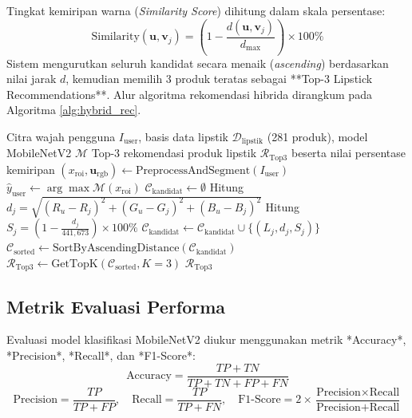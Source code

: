 \documentclass[10pt,a4paper]{article}
\begin{document}
Tingkat kemiripan warna (\textit{Similarity Score}) dihitung dalam skala persentase:
\begin{equation}
 \text{Similarity}(\mathbf{u}, \mathbf{v}_j) = \left( 1 - \frac{d(\mathbf{u}, \mathbf{v}_j)}{d_{\max}} \right) \times 100\%
 \label{eq:similarity}
\end{equation}
Sistem mengurutkan seluruh kandidat secara menaik (\textit{ascending}) berdasarkan nilai jarak $d$, kemudian memilih 3 produk teratas sebagai **Top-3 Lipstick Recommendations**. Alur algoritma rekomendasi hibrida dirangkum pada Algoritma \ref{alg:hybrid_rec}.

\begin{algorithm}[H]
\caption{Algoritma Hybrid Recommendation System untuk Rekomendasi Lipstik}
\label{alg:hybrid_rec}
\fontsize{8.5pt}{11pt}\selectfont
\begin{algorithmic}[1]
\Require Citra wajah pengguna $I_{\text{user}}$, basis data lipstik $\mathcal{D}_{\text{lipstik}}$ (281 produk), model MobileNetV2 $\mathcal{M}$
\Ensure Top-3 rekomendasi produk lipstik $\mathcal{R}_{\text{Top3}}$ beserta nilai persentase kemiripan
\State $(x_{\text{roi}}, \mathbf{u}_{\text{rgb}}) \leftarrow \text{PreprocessAndSegment}(I_{\text{user}})$ 
\State $\hat{y}_{\text{user}} \leftarrow \arg\max \mathcal{M}(x_{\text{roi}})$ 
\State $\mathcal{C}_{\text{kandidat}} \leftarrow \emptyset$
 \State Hitung $d_j = \sqrt{(R_u - R_j)^2 + (G_u - G_j)^2 + (B_u - B_j)^2}$
 \State Hitung $S_j = \left(1 - \frac{d_j}{441{,}673}\right) \times 100\%$
 \State $\mathcal{C}_{\text{kandidat}} \leftarrow \mathcal{C}_{\text{kandidat}} \cup \{(L_j, d_j, S_j)\}$
 \EndIf
\EndFor
\State $\mathcal{C}_{\text{sorted}} \leftarrow \text{SortByAscendingDistance}(\mathcal{C}_{\text{kandidat}})$
\State $\mathcal{R}_{\text{Top3}} \leftarrow \text{GetTopK}(\mathcal{C}_{\text{sorted}}, K=3)$
\State \Return $\mathcal{R}_{\text{Top3}}$
\end{algorithmic}
\end{algorithm}

\subsection{Metrik Evaluasi Performa}
Evaluasi model klasifikasi MobileNetV2 diukur menggunakan metrik *Accuracy*, *Precision*, *Recall*, dan *F1-Score*:
\begin{equation}
 \text{Accuracy} = \frac{TP + TN}{TP + TN + FP + FN}
\end{equation}
\begin{equation}
 \text{Precision} = \frac{TP}{TP + FP}, \quad \text{Recall} = \frac{TP}{TP + FN}, \quad \text{F1-Score} = 2 \times \frac{\text{Precision} \times \text{Recall}}{\text{Precision} + \text{Recall}}
\end{equation}
\end{document}
